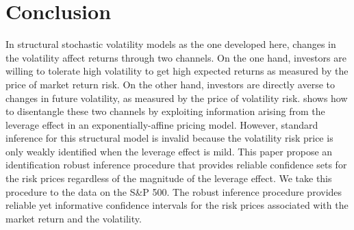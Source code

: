 \documentclass[11pt, letterpaper, twoside]{article}
\begin{document}








\section{Conclusion}\label{sec:conclusion}


In structural stochastic volatility models as the one developed here, changes in the volatility affect returns through two channels. On the one hand, investors are willing to tolerate high volatility to get high expected returns as measured by the price of market return risk. On the other hand, investors are directly averse to changes in future volatility, as measured by the price of volatility risk. \Textcite{han2018leverage} shows how to disentangle these two channels by exploiting information arising from the leverage effect in an exponentially-affine pricing model. However, standard inference for this structural model is invalid because the volatility risk price is only weakly identified when the leverage effect is mild. This paper propose an identification robust inference procedure that provides reliable confidence sets for the risk prices regardless of the magnitude of the leverage effect. We take this procedure to the data on the S\&P 500. The robust inference procedure provides reliable yet informative confidence intervals for the risk prices associated with the market return and the volatility. 





\printbibliography
\clearpage
\end{document}
